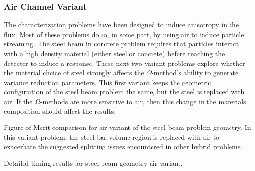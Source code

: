 \subsubsection{Air Channel Variant}
\label{subsubsec:airbeam}

The characterization problems have been designed to induce anisotropy in
the flux. Most of these problems do so, in some part, by using air to induce
particle streaming. The steel beam in concrete problem requires that particles
interact with a high density material (either steel or concrete) before reaching
the detector to induce a response. These next two variant problems explore
whether the material choice of steel strongly affects the $\Omega$-method's
ability to generate variance reduction parameters. This first variant keeps the
geometric configuration of the steel beam problem the same, but the steel is
replaced with air. If the $\Omega$-methods are more sensitive to air, then this
change in the materials composition should affect the results.

\begin{table}[h!]
  \centering
  
  \caption[Figure of Merit comparison for the air variant of the steel beam
  problem geometry.]
  {Figure of Merit comparison for air variant of the steel beam problem geometry. In this
  variant problem, the steel bar volume region is replaced with air to
exacerbate the suggested splitting issues encountered in other hybrid problems. }
  \label{tab:airbeamfoms}
\end{table}

\begin{table}[h!]
  \centering
  
  \caption[Detailed timing results for steel beam geometry air variant.]
  {Detailed timing results for steel beam geometry air variant.}
  \label{tab:airbeamtimes}
\end{table}


